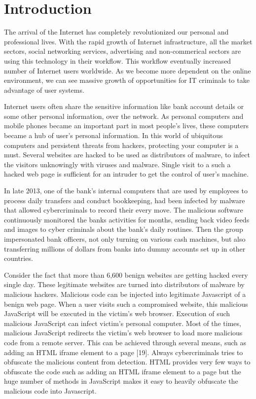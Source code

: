 \chapter{Introduction}

The arrival of the Internet has completely revolutionized our personal and professional lives. With the rapid growth of Internet infrastructure, all the market sectors, social networking services, advertising and non-commerical sectors are using this technology in their workflow. This workflow eventually increased number of Internet users worldwide. As we become more dependent on the online environment, we can see massive growth of opportunities for IT criminals to take advantage of user systems. 

Internet users often share the sensitive information like bank account details or some other personal information, over the network. As personal computers and mobile phones became an important part in most people's lives, these computers became a hub of user's personal information. In this world of ubiquitous computers and persistent threats from hackers, protecting your computer is a must. Several websites are hacked to be used as distributors of malware, to infect the visitors unknowingly with viruses and malware. Single visit to a such a hacked web page is sufficient for an intruder to get the control of user's machine.

In late 2013, one of the bank’s internal computers that are used by employees to process daily transfers and conduct bookkeeping, had been infected by malware that allowed cybercriminals to record their every move. The malicious software continuously monitored the banks activities for months, sending back video feeds and images to cyber criminals about the bank's daily routines. Then the group impersonated bank officers, not only turning on various cash machines, but also transferring millions of dollars from banks into dummy accounts set up in other countries.

Consider the fact that more than 6,600 benign websites are getting hacked every single day. These legitimate websites are turned into distributors of malware by malicious hackers. Malicious code can be injected into legitimate Javascript of a benign web page. When a user visits such a compromised website, this malicious JavaScript will be executed in the victim's web browser. Execution of such malicious JavaScript can infect victim's personal computer. Most of the times, malicious JavaScript redirects the victim's web browser to load more malicious code from a remote server. This can be achieved through several means, such as adding an HTML iframe element to a page [19]. Always cybercriminals tries to obfuscate the malicious content from detection. HTML provides very few ways to obfuscate the code such as adding an HTML iframe element to a page but the huge number of methods in JavaScript makes it easy to heavily obfuscate the malicious code into Javascript.


